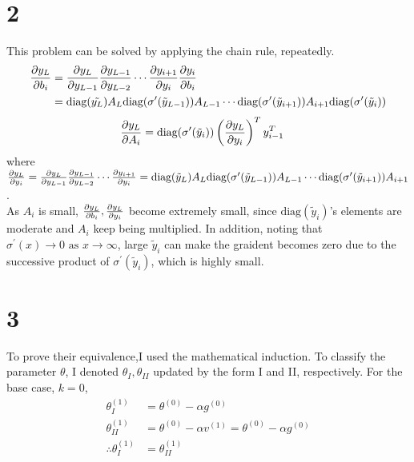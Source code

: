 \documentclass[10pt]{article}
\begin{document}
\section*{2}
This problem can be solved by applying the chain rule, repeatedly.
\begin{align}
    {\partial y_L \over \partial b_i} &= {\partial y_L \over \partial y_{L-1}} {\partial y_{L-1}\over \partial y_{L-2}}\cdots {\partial y_{i+1}\over \partial y_{i}}{\partial y_i \over \partial b_i} \\
    &= \text{diag}(\tilde{y_L})A_L \text{diag}(\sigma^\prime(\tilde{y}_{L-1}))A_{L-1}\cdots\text{diag}(\sigma^\prime(\tilde{y}_{i+1}))A_{i+1}\text{diag}(\sigma^\prime(\tilde{y}_i))
\end{align} 
\begin{align}
    {\partial y_L \over \partial A_i} &= \text{diag}(\sigma^\prime(\tilde{y}_i))\left({\partial y_L \over \partial y_i}\right)^Ty_{i-1}^T
\end{align}
where ${\partial y_L \over \partial y_i} = {\partial y_L \over \partial y_{L-1}} {\partial y_{L-1} \over \partial y_{L-2}} \cdots {\partial y_{i+1} \over \partial y_i} = \text{diag}(\tilde{y}_L)A_L\text{diag}(\sigma^\prime(\tilde{y}_{L-1}))A_{L-1} \cdots \text{diag}(\sigma^\prime(\tilde{y}_{i+1}))A_{i+1}$. \\
As $A_i$ is small, ${\partial y_L \over \partial b_i}, {\partial y_L \over \partial y_i}$ become extremely small, since $\text{diag}(\tilde{y}_i)$'s elements are moderate and $A_i$ keep being multiplied.
In addition, noting that $\sigma^\prime(x) \rightarrow 0 \text{ as } x\rightarrow \infty$, large $\tilde{y}_i$ can make the graident becomes zero due to the successive product of $\sigma^\prime(\tilde{y}_i)$, which is highly small.

\section*{3}
To prove their equivalence,I used the mathematical induction. To classify the parameter $\theta$, I denoted $\theta_I, \theta_{II}$ updated by the form I and II, respectively.
For the base case, $k = 0$, 
\begin{align*}
    \theta^{(1)}_I &= \theta^{(0)} - \alpha g^{(0)} \\
    \theta^{(1)}_{II} &= \theta^{(0)} - \alpha v^{(1)} = \theta^{(0)} - \alpha g^{(0)} \\
    \therefore \theta_I^{(1)} &= \theta_{II}^{(1)}
\end{align*}
\end{document}
